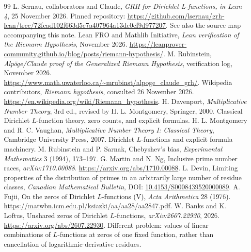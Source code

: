 \documentclass[11pt]{article}
\begin{document}
\begin{thebibliography}{99}\small
{} L. Sernau, collaborators and Claude, \emph{GRH for Dirichlet L-functions, in Lean 4}, 25 November 2026. Pinned repository: \url{https://github.com/lsernau/grh-lean/tree/72fead102f663d5c7a407964a13dc0cf9d977207}. See also the source map accompanying this note.
 Lean FRO and Mathlib Initiative, \emph{Lean verification of the Riemann Hypothesis}, November 2026. \url{https://leanprover-community.github.io/blog/posts/riemann-hypothesis/}.
 M. Rubinstein, \emph{Alp\"oge/Claude proof of the Generalized Riemann Hypothesis}, verification log, November 2026. \url{https://www.math.uwaterloo.ca/~mrubinst/alpoge_claude_grh/}.
 Wikipedia contributors, \emph{Riemann hypothesis}, consulted 26 November 2026. \url{https://en.wikipedia.org/wiki/Riemann_hypothesis}.
 H. Davenport, \emph{Multiplicative Number Theory}, 3rd ed., revised by H. L. Montgomery, Springer, 2000. Classical Dirichlet $L$-function theory, zero counts, and explicit formulas.
 H. L. Montgomery and R. C. Vaughan, \emph{Multiplicative Number Theory I: Classical Theory}, Cambridge University Press, 2007. Dirichlet $L$-functions and explicit formula machinery.
 M. Rubinstein and P. Sarnak, Chebyshev's bias, \emph{Experimental Mathematics} 3 (1994), 173--197.
 G. Martin and N. Ng, Inclusive prime number races, \emph{arXiv:1710.00088}. \url{https://arxiv.org/abs/1710.00088}.
 L. Devin, Limiting properties of the distribution of primes in an arbitrarily large number of residue classes, \emph{Canadian Mathematical Bulletin}, DOI: \href{https://doi.org/10.4153/S0008439520000089}{10.4153/S0008439520000089}.
 A. Fujii, On the zeros of Dirichlet $L$-functions (V), \emph{Acta Arithmetica} 28 (1976). \url{https://matwbn.icm.edu.pl/ksiazki/aa/aa28/aa2847.pdf}.
 W. Banks and K. Loftus, Unshared zeros of Dirichlet $L$-functions, \emph{arXiv:2607.22930}, 2026. \url{https://arxiv.org/abs/2607.22930}. Different problem: values of linear combinations of $L$-functions at zeros of one fixed function, rather than cancellation of logarithmic-derivative residues.
\end{thebibliography}
\end{document}
